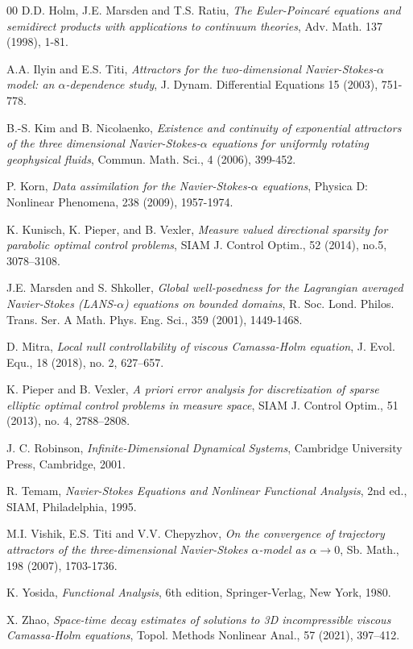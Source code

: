 \documentclass[reqno]{amsart}
\begin{document}
\begin{thebibliography}{00}
		 D.D. Holm, J.E. Marsden and T.S. Ratiu, \textit{The Euler-Poincar\'{e} equations and semidirect products with applications to continuum theories},  Adv. Math. 137 (1998), 1-81. 
		
		 A.A. Ilyin and E.S. Titi, \textit{Attractors for the two-dimensional Navier-Stokes-$\alpha$ model: an $\alpha$-dependence study}, J. Dynam. Differential Equations 15 (2003), 751-778.
		
		 B.-S. Kim and B. Nicolaenko, \textit{Existence and continuity of exponential attractors of the three dimensional Navier-Stokes-$\alpha$ equations for uniformly rotating geophysical fluids}, Commun. Math. Sci., 4 (2006), 399-452.
		
		 P. Korn, \textit{Data assimilation for the Navier-Stokes-$\alpha$ equations}, Physica D: Nonlinear Phenomena, 238 (2009), 1957-1974.
		
		 K. Kunisch, K. Pieper, and B. Vexler, \textit{Measure valued directional sparsity for parabolic optimal
			control problems}, SIAM J. Control Optim., 52 (2014), no.5, 3078–3108.
		
		
		 J.E. Marsden and S. Shkoller, \textit{Global well-posedness for the Lagrangian averaged Navier-Stokes (LANS-$\alpha$) equations on bounded domains}, R. Soc. Lond. Philos. Trans. Ser. A Math. Phys. Eng. Sci., 359 (2001), 1449-1468.
		
		 D. Mitra, \textit{Local null controllability of viscous Camassa-Holm equation}, J. Evol. Equ., 18 (2018), no. 2, 627–657. 
		
		 K. Pieper and B. Vexler, \textit{A priori error analysis for discretization of sparse elliptic optimal control
			problems in measure space}, SIAM J. Control Optim., 51 (2013), no. 4, 2788–2808.
		
		
		 J. C. Robinson, \textit{Infinite-Dimensional Dynamical Systems}, Cambridge University Press, Cambridge, 2001.
		
		 R. Temam, {\it Navier-Stokes Equations and Nonlinear Functional Analysis}, 2nd ed., SIAM, Philadelphia, 1995.
		
		 M.I. Vishik, E.S. Titi and V.V. Chepyzhov, \textit{On the convergence of trajectory attractors of the three-dimensional Navier-Stokes $\alpha$-model as $\alpha\to0$}, Sb. Math., 198 (2007), 1703-1736.
		
		 K. Yosida, \textit{Functional Analysis}, 6th edition, Springer-Verlag, New York, 1980.
		
		 X. Zhao, \textit{Space-time decay estimates of solutions to 3D incompressible viscous Camassa-Holm equations}, Topol. Methods Nonlinear Anal., 57 (2021),  397–412. 
		
	\end{thebibliography}
	
\end{document}
